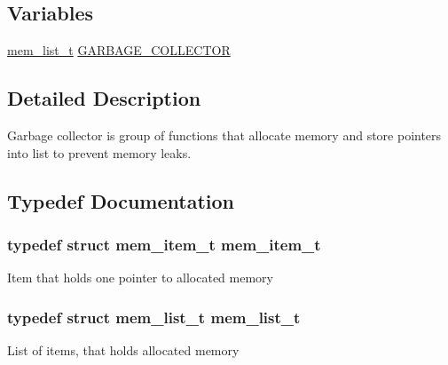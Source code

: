 \subsection*{Variables}
\begin{DoxyCompactItemize}
\item 
\hyperlink{structmem__list__t}{mem\+\_\+list\+\_\+t} \hyperlink{group__garbage__collector_ga8aa3a6ffdd5d503b42049f17fe0c23a2}{G\+A\+R\+B\+A\+G\+E\+\_\+\+C\+O\+L\+L\+E\+C\+T\+OR}
\end{DoxyCompactItemize}


\subsection{Detailed Description}
Garbage collector is group of functions that allocate memory and store pointers into list to prevent memory leaks. 



\subsection{Typedef Documentation}
\subsubsection[{\texorpdfstring{mem\+\_\+item\+\_\+t}{mem_item_t}}]{\setlength{\rightskip}{0pt plus 5cm}typedef struct {\bf mem\+\_\+item\+\_\+t}  {\bf mem\+\_\+item\+\_\+t}}\hypertarget{group__garbage__collector_ga45f8d443bc7a0cc8c6fd0c12d59626b0}{}\label{group__garbage__collector_ga45f8d443bc7a0cc8c6fd0c12d59626b0}
Item that holds one pointer to allocated memory 
\subsubsection[{\texorpdfstring{mem\+\_\+list\+\_\+t}{mem_list_t}}]{\setlength{\rightskip}{0pt plus 5cm}typedef struct {\bf mem\+\_\+list\+\_\+t}  {\bf mem\+\_\+list\+\_\+t}}\hypertarget{group__garbage__collector_ga36b1703faf3c854ab706e2d1565d0675}{}\label{group__garbage__collector_ga36b1703faf3c854ab706e2d1565d0675}
List of items, that holds allocated memory 

